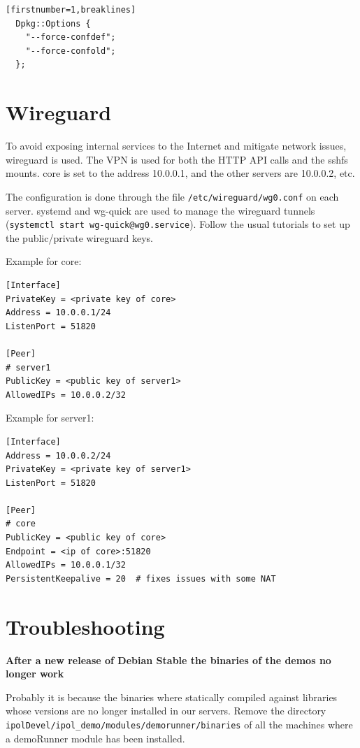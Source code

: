 \documentclass[a4paper,12pt]{article}
\begin{document}
\begin{verbatim}[firstnumber=1,breaklines]
  Dpkg::Options {
    "--force-confdef";
    "--force-confold";
  };
\end{verbatim}


\section{Wireguard}

To avoid exposing internal services to the Internet and mitigate network issues, wireguard is used.
The VPN is used for both the HTTP API calls and the sshfs mounts.
core is set to the address 10.0.0.1, and the other servers are 10.0.0.2, etc.

The configuration is done through the file {\tt /etc/wireguard/wg0.conf} on each server.
systemd and wg-quick are used to manage the wireguard tunnels ({\tt systemctl start wg-quick@wg0.service}).
Follow the usual tutorials to set up the public/private wireguard keys.

Example for core:
\begin{verbatim}
[Interface]
PrivateKey = <private key of core>
Address = 10.0.0.1/24
ListenPort = 51820

[Peer]
# server1
PublicKey = <public key of server1>
AllowedIPs = 10.0.0.2/32
\end{verbatim}

Example for server1:
\begin{verbatim}
[Interface]
Address = 10.0.0.2/24
PrivateKey = <private key of server1>
ListenPort = 51820

[Peer]
# core
PublicKey = <public key of core>
Endpoint = <ip of core>:51820
AllowedIPs = 10.0.0.1/32
PersistentKeepalive = 20  # fixes issues with some NAT
\end{verbatim}


\section{Troubleshooting}

\textbf{After a new release of Debian Stable the binaries of the demos no longer work}

Probably it is because the binaries where statically compiled against libraries whose versions are no longer installed in our servers. Remove the directory {\tt ipolDevel/ipol\_demo/modules/demorunner/binaries} of all the machines where a demoRunner module has been installed.
\vspace{0.5cm}
\end{document}
